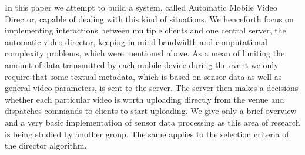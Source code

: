\documentclass[conference]{IEEEtran}
\begin{document}
In this paper we attempt to build a system, called Automatic Mobile Video Director, capable of dealing with this kind of situations.
We henceforth focus on implementing interactions between multiple clients and one central server, the automatic video director,
keeping in mind bandwidth and computational complexity problems, which were mentioned above. 
As a mean of limiting the amount of data transmitted by each mobile device during the event we only require 
that some textual metadata, which is based on sensor data as well as general video parameters, is sent to the server.
The server then makes a decisions whether each particular video is worth uploading directly from the venue
and dispatches commands to clients to start uploading.
We give only a brief overview and a very basic implementation of sensor data processing as this area of research 
is being studied by another group. The same applies to the selection criteria of the director algorithm.

%
%


%
%
\end{document}
